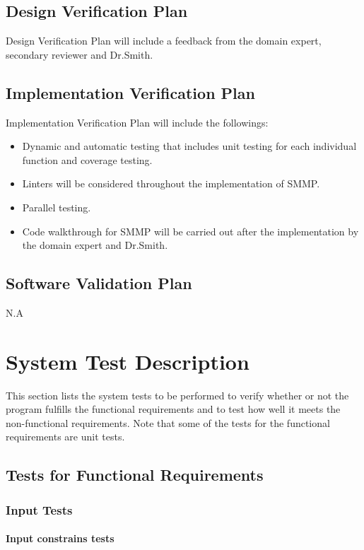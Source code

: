 \documentclass[12pt, titlepage]{article}
\begin{document}
\subsection{Design Verification Plan}

Design Verification Plan will include a feedback from the domain expert, secondary reviewer and Dr.Smith. 

\subsection{Implementation Verification Plan}

Implementation Verification Plan will include the followings:
\begin{itemize}
\item Dynamic and automatic testing that includes unit testing for each individual function and coverage testing.
\item  Linters will be considered throughout the implementation of SMMP.
\item Parallel testing. 
\item Code walkthrough for SMMP will be carried out after the implementation by the domain expert and Dr.Smith.
\end{itemize}

\subsection{Software Validation Plan}
N.A

\section{System Test Description}

This section lists the system tests to be performed to verify whether or not the
program fulfills the functional requirements and to test how well it meets the
non-functional requirements. Note that some of the tests for the functional
requirements are unit tests.

\subsection{Tests for Functional Requirements}

\subsubsection{Input Tests}

\paragraph{Input constrains tests}
\end{document}
